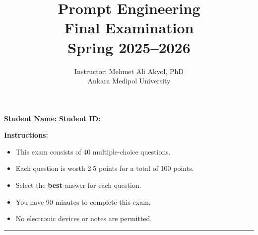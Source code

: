 \documentclass[11pt]{article}
\title{\textbf{Prompt Engineering}\\\large Final Examination\\Spring 2025--2026}
\author{Instructor: Mehmet Ali Akyol, PhD\\Ankara Medipol University}
\date{}
\begin{document}
\maketitle

\noindent\textbf{Student Name:} \underline{\hspace{6cm}} \hfill \textbf{Student ID:} \underline{\hspace{4cm}}

\vspace{0.5cm}
\noindent\textbf{Instructions:}
\begin{itemize}[noitemsep]
    \item This exam consists of 40 multiple-choice questions.
    \item Each question is worth 2.5 points for a total of 100 points.
    \item Select the \textbf{best} answer for each question.
    \item You have 90 minutes to complete this exam.
    \item No electronic devices or notes are permitted.
\end{itemize}

\vspace{0.5cm}
\hrule
\vspace{0.5cm}
\end{document}
